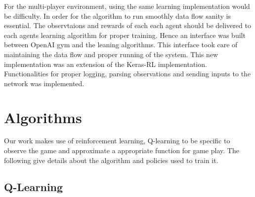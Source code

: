 \documentclass[conference,10pt]{IEEEtran}
\begin{document}
	For the multi-player environment, using the same learning implementation would be difficulty. In order for the algorithm to run smoothly data flow sanity is essential. The observtaions and rewards of each each agent should be delivered to each agents learning algorithm for proper training. Hence an interface was built between OpenAI gym and the leaning algorithms. This interface took care of maintaining the data flow and proper running of the system. This new implementation was an extension of the Keras-RL implementation. Functionalities for proper logging, parsing observations and sending inputs to the network was implemented. 

	\section{Algorithms}
	Our work makes use of reinforcement learning, Q-learning to be specific to observe the game and approximate a appropriate function for game play. The following give details about the algorithm and policies used to train it.

	\subsection{Q-Learning}
	
\end{document}
